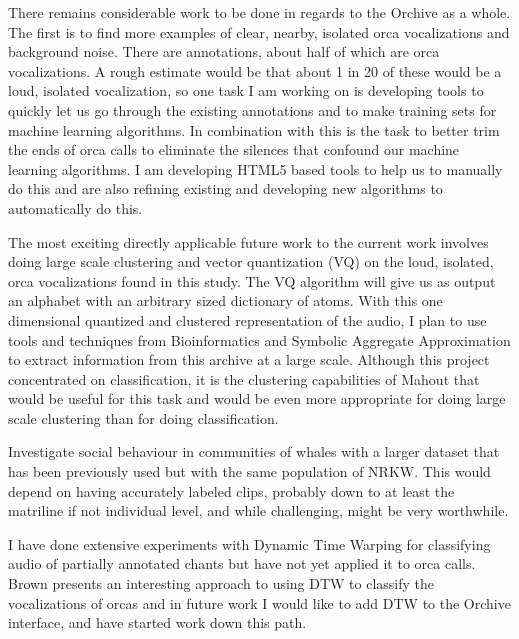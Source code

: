 

\label{chap:future}

There remains considerable work to be done in regards to the Orchive
as a whole.  The first is to find more examples of clear, nearby,
isolated orca vocalizations and background noise.  There are
\totalAnnotations annotations, about half of which are orca
vocalizations.  A rough estimate would be that about 1 in 20 of these
would be a loud, isolated vocalization, so one task I am working on
is developing tools to quickly let us go through the existing
annotations and to make training sets for machine learning algorithms.
In combination with this is the task to better trim the ends of orca
calls to eliminate the silences that confound our machine learning
algorithms.  I am developing HTML5 based tools to help us to
manually do this and are also refining existing and developing new
algorithms to automatically do this.

The most exciting directly applicable future work to the current work
involves doing large scale clustering and vector quantization (VQ) on
the loud, isolated, orca vocalizations found in this study.  The VQ
algorithm will give us as output an alphabet with an arbitrary sized
dictionary of atoms.  With this one dimensional quantized and
clustered representation of the audio, I plan to use tools and
techniques from Bioinformatics \cite{sarkar2002discovering} and
Symbolic Aggregate Approximation \cite{lin07sax} to extract
information from this archive at a large scale.  Although this project
concentrated on classification, it is the clustering capabilities of
Mahout that would be useful for this task and would be even more
appropriate for doing large scale clustering than for doing
classification.

Investigate social behaviour in communities of whales
\cite{weiss2007intra} with a larger dataset that has been previously
used \cite{janik2000social} but with the same population of NRKW.
This would depend on having accurately labeled clips, probably down to
at least the matriline if not individual level, and while challenging,
might be very worthwhile.

I have done extensive experiments with Dynamic Time Warping for
classifying audio of partially annotated chants \cite{ness2008chants}
but have not yet applied it to orca calls.  Brown
\cite{brown2006classifying} presents an interesting approach to using
DTW to classify the vocalizations of orcas and in future work I would
like to add DTW to the Orchive interface, and have started work down
this path.


